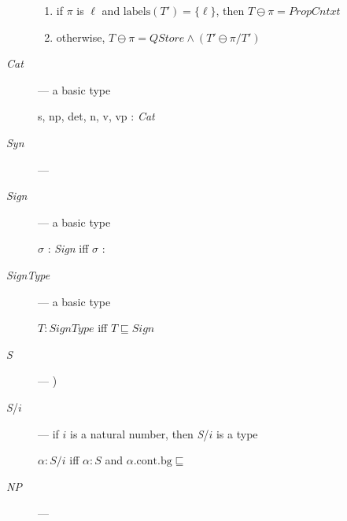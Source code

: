 \begin{description}
\begin{enumerate}
  \item if $\pi$ is $\ell$ and $\mathrm{labels}(T')=\{\ell\}$, then $T\ominus\pi=\textit{PropCntxt}$
    
  \item otherwise, $T\ominus\pi= \textit{QStore}\wedge(T'\ominus \pi/T')$
  \end{enumerate}
  

      
    \item[\textnormal{\textit{Cat}}] --- a basic type

      s, np, det, n, v, vp : \textit{Cat}

    
    \item[\textnormal{\textit{Syn}}] ---   
 


  
    \item[\textnormal{\textit{Sign}}] ---  a basic type

      $\sigma$ : \textit{Sign} iff $\sigma$ :

  
\item[\textnormal{\textit{SignType}}] --- a basic type

  $T:\textit{SignType}$ iff $T\sqsubseteq\textit{Sign}$ 

  
\item[\textnormal{\textit{S}}] --- 
  )
  
\item[\textnormal{\textit{S}/$i$}] --- if $i$ is a natural
  number, then \textit{S}/$i$ is a type

  $\alpha:\textit{S}/i$ iff $\alpha:\textit{S}$ and $\alpha.\text{cont}.\text{bg}\sqsubseteq$ 
  
  
\item[\textnormal{\textit{NP}}] --- 
  

\end{description}
